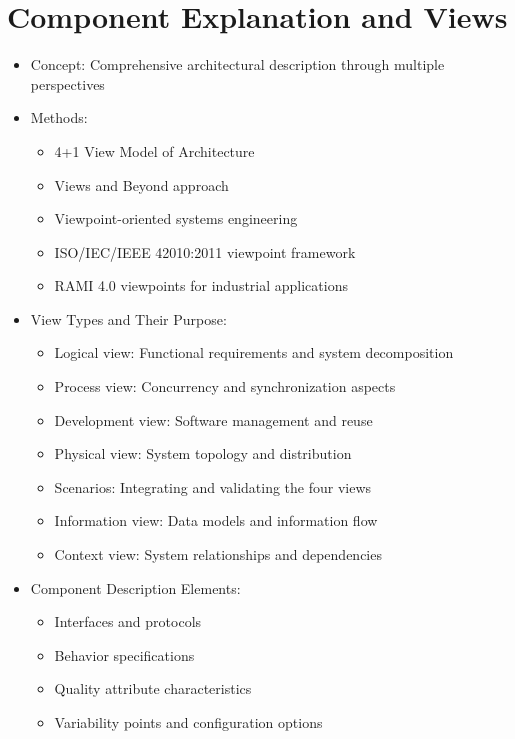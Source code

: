 \documentclass[12pt,a4paper]{article}
\begin{document}
\section{Component Explanation and Views}
\begin{itemize}
    \item Concept: Comprehensive architectural description through multiple perspectives
    \item Methods:
    \begin{itemize}
        \item 4+1 View Model of Architecture \citep{Kruchten1995}
        \item Views and Beyond approach \citep{Clements2010}
        \item Viewpoint-oriented systems engineering \citep{Finkelstein1992}
        \item ISO/IEC/IEEE 42010:2011 viewpoint framework \citep{ISO42010}
        \item RAMI 4.0 viewpoints for industrial applications \citep{Adolphs2015}
    \end{itemize}
    \item View Types and Their Purpose:
    \begin{itemize}
        \item Logical view: Functional requirements and system decomposition
        \item Process view: Concurrency and synchronization aspects
        \item Development view: Software management and reuse
        \item Physical view: System topology and distribution
        \item Scenarios: Integrating and validating the four views \citep{Kruchten1995}
        \item Information view: Data models and information flow \citep{Rozanski2012}
        \item Context view: System relationships and dependencies \citep{Rozanski2012}
    \end{itemize}
    \item Component Description Elements:
    \begin{itemize}
        \item Interfaces and protocols
        \item Behavior specifications
        \item Quality attribute characteristics
        \item Variability points and configuration options

\end{itemize}
\end{itemize}
\end{document}
